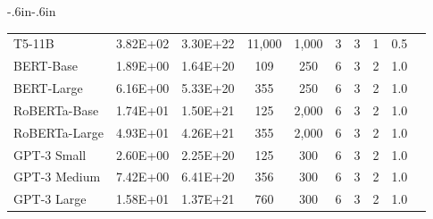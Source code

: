 \documentclass{article}
\begin{document}
\begin{table}[!h]
\begin{adjustwidth}{-.6in}{-.6in}
{\begin{center}
\begin{tabular}{lccccccccc}
                    T5-11B &                      3.82E+02 &                    3.30E+22 &     11,000 &                      1,000 &                               3 &                       3 &                                         1 &                                      0.5 &   \\
                 BERT-Base &                      1.89E+00 &                    1.64E+20 &        109 &                        250 &                               6 &                       3 &                                         2 &                                      1.0 &   \\
                BERT-Large &                      6.16E+00 &                    5.33E+20 &        355 &                        250 &                               6 &                       3 &                                         2 &                                      1.0 &   \\
              RoBERTa-Base &                      1.74E+01 &                    1.50E+21 &        125 &                      2,000 &                               6 &                       3 &                                         2 &                                      1.0 &   \\
             RoBERTa-Large &                      4.93E+01 &                    4.26E+21 &        355 &                      2,000 &                               6 &                       3 &                                         2 &                                      1.0 &   \\
               GPT-3 Small &                      2.60E+00 &                    2.25E+20 &        125 &                        300 &                               6 &                       3 &                                         2 &                                      1.0 &   \\
              GPT-3 Medium &                      7.42E+00 &                    6.41E+20 &        356 &                        300 &                               6 &                       3 &                                         2 &                                      1.0 &   \\
               GPT-3 Large &                      1.58E+01 &                    1.37E+21 &        760 &                        300 &                               6 &                       3 &                                         2 &                                      1.0 &   \\

\end{tabular}
\end{center}}
\end{adjustwidth}
\end{table}
\end{document}
